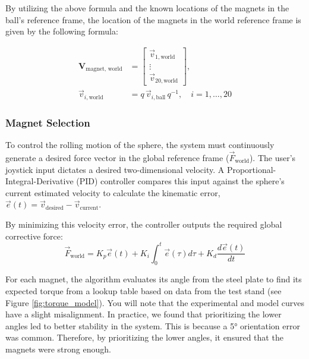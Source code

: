 \documentclass[11pt]{article}
\begin{document}
By utilizing the above formula and the known locations of the magnets in the ball's reference frame, the location of the magnets in the world reference frame is given by the following formula:

\begin{equation}
    \begin{aligned}
        \mathbf{V}_{\text{magnet, world}} &= \begin{bmatrix}
            \vec{v}_{1,\text{world}} \\
            \vdots \\
            \vec{v}_{20,\text{world}}
        \end{bmatrix}, \\
        \vec{v}_{i,\text{world}} &= q\,\vec{v}_{i, \text{ball}}\,q^{-1}, \quad i=1,\ldots,20
    \end{aligned}
    \label{eqn:magnet_world_location}
\end{equation}

\subsubsection{Magnet Selection}
\label{sec:magnet_selection}
To control the rolling motion of the sphere, the system must continuously generate a desired force vector in the global reference frame ($\vec{F}_{\text{world}}$). The user's joystick input dictates a desired two-dimensional velocity. A Proportional-Integral-Derivative (PID) controller compares this input against the sphere's current estimated velocity to calculate the kinematic error, $\vec{e}(t) = \vec{v}_{\text{desired}} - \vec{v}_{\text{current}}$. 

By minimizing this velocity error, the controller outputs the required global corrective force:
\begin{equation}
    \vec{F}_{\text{world}} = K_p \vec{e}(t) + K_i \int_{0}^{t} \vec{e}(\tau) d\tau + K_d \frac{d\vec{e}(t)}{dt}
\end{equation}

For each magnet, the algorithm evaluates its angle from the steel plate to find its expected torque from a lookup table based on data from the test stand (see Figure \ref{fig:torque_model}). You will note that the experimental and model curves have a slight misalignment. In practice, we found that prioritizing the lower angles led to better stability in the system. This is because a 5° orientation error was common. Therefore, by prioritizing the lower angles, it ensured that the magnets were strong enough.
\end{document}
